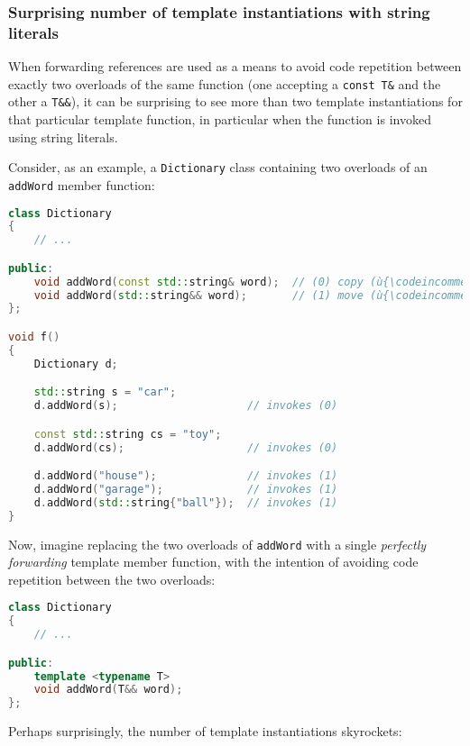 \subsubsection[Surprising number of template instantiations with string literals]{Surprising number of template instantiations with string literals}\label{surprising-number-of-template-instantiations-with-string-literals}

When forwarding references are used as a means to avoid code repetition
between exactly two overloads of the same function (one accepting a
\texttt{const}~\texttt{T\&} and the other a \texttt{T\&\&}), it can be
surprising to see more than two template instantiations for that
particular template function, in particular when the function is invoked
using string literals.

Consider, as an example, a \texttt{Dictionary} class containing two
overloads of an \texttt{addWord} member function:

\begin{lstlisting}[language=C++]
class Dictionary
{
    // ...

public:
    void addWord(const std::string& word);  // (0) copy (ù{\codeincomments{word}}ù) in the dictionary
    void addWord(std::string&& word);       // (1) move (ù{\codeincomments{word}}ù) in the dictionary
};

void f()
{
    Dictionary d;

    std::string s = "car";
    d.addWord(s);                    // invokes (0)

    const std::string cs = "toy";
    d.addWord(cs);                   // invokes (0)

    d.addWord("house");              // invokes (1)
    d.addWord("garage");             // invokes (1)
    d.addWord(std::string{"ball"});  // invokes (1)
}
\end{lstlisting}

\noindent Now, imagine replacing the two overloads of \texttt{addWord} with a
single \textit{perfectly forwarding} template member function, with the intention
of avoiding code repetition between the two overloads:

\begin{lstlisting}[language=C++]
class Dictionary
{
    // ...

public:
    template <typename T>
    void addWord(T&& word);
};
\end{lstlisting}

\noindent Perhaps surprisingly, the number of template instantiations skyrockets:

